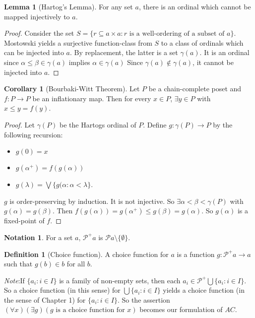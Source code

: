\documentclass[a4paper]{article}
\theoremstyle{definition}
\newtheorem*{defi}{Definition}
\newtheorem*{lemma}{Lemma}
\newtheorem*{notation}{Notation}
\newtheorem*{cor}{Corollary}
\newcommand{\note}{\noindent \emph{Note}:\;}
\newcommand{\Po}{\mathcal{P}}
\begin{document}
\begin{lemma}[Hartog's Lemma]
  For any set $a$, there is an ordinal which cannot be mapped injectively to $a$.
\end{lemma}

\begin{proof}
  Consider the set $S = \{r\subseteq a\times a: r\text{ is a well-ordering of a subset of }a\}$. Mostowski yields a surjective function-class from $S$ to a class of ordinals which can be injected into $a$. By replacement, the latter is a set $\gamma(a)$. It is an ordinal since $\alpha \leq \beta \in \gamma(a)$ implies $\alpha\in \gamma(a)$ Since $\gamma(a)\not\in \gamma(a)$, it cannot be injected into $a$.
\end{proof}

\begin{cor}[Bourbaki-Witt Theorem]
  Let $P$ be a chain-complete poset and $f: P\to P$ be an inflationary map. Then for every $x\in P$, $\exists y\in P$ with $x \leq y= f(y)$.
\end{cor}

\begin{proof}
  Let $\gamma(P)$ be the Hartogs ordinal of $P$. Define $g: \gamma(P)\to P$ by the following recursion:
  \begin{itemize}
  \item $g(0) = x$
  \item $g(\alpha^+) = f(g(\alpha))$
  \item $g(\lambda) = \bigvee\{g(\alpha: \alpha < \lambda\}$.
  \end{itemize}
  $g$ is order-preserving by induction. It is not injective. So $\exists \alpha < \beta < \gamma(P)$ with $g(\alpha) = g(\beta)$. Then $f(g(\alpha)) = g(\alpha^+) \leq g(\beta) = g(\alpha)$. So $g(\alpha)$ is a fixed-point of $f$.
\end{proof}

\begin{notation}
  For a set $a$, $\Po^+a$ is $\Po a\setminus\{\emptyset\}$.
\end{notation}

\begin{defi}[Choice function]
  A choice function for $a$ is a function $g: \Po^+a \to a$ such that $g(b)\in b$ for all $b$.
\end{defi}

\note If $\{a_i: i \in I\}$ is a family of non-empty sets, then each $a_i \in \Po^+\bigcup\{a_i: i\in I\}$. So a choice function (in this sense) for $\bigcup\{a_i: i\in I\}$ yields a choice function (in the sense of Chapter 1) for $\{a_i: i\in I\}$. So the assertion $(\forall x)(\exists g)(g\text{ is a choice function for }x)$ becomes our formulation of $AC$.
\end{document}

